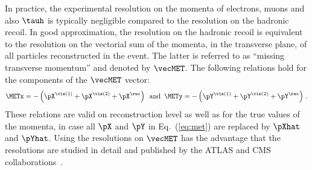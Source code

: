In practice, the experimental resolution on the momenta of electrons, muons and also $\tauh$
is typically negligible compared to the resolution on the hadronic recoil.
In good approximation, the resolution on the hadronic recoil is equivalent
to the resolution on the vectorial sum of the momenta, in the transverse plane,
of all particles reconstructed in the event.
The latter is referred to as ``missing transverse momentum'' and denoted by $\vecMET$.
The following relations hold for the components of the $\vecMET$
vector:
\begin{equation}
\METx = - \left( \pX^{\vis(1)} + \pX^{\vis(2)} + \pX^{\rec} \right)
\, \mbox { and } \,
\METy = - \left( \pY^{\vis(1)} + \pY^{\vis(2)} + \pY^{\rec} \right) \, .
\label{eq:met}
\end{equation}
These relations are valid on reconstruction level as well as for the
true values of the momenta, \ie in case all $\pX$ and $\pY$ in
Eq.~(\ref{eq:met}) are replaced by $\pXhat$ and $\pYhat$.
Using the resolutions on $\vecMET$ has the advantage that the resolutions
are studied in detail and published by the ATLAS and CMS collaborations~\cite{CMS-JME-13-003,ATLAS-CONF-2014-019}.

